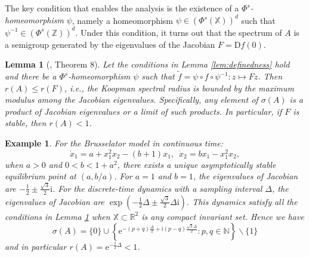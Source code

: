 \documentclass[english]{cccconf}
\renewcommand{\emph}[1]{\textit{#1}}
\newtheorem{lemma}{Lemma}
\newtheorem{example}{Example}
\newcommand{\mr}[1]{\mathrm{#1}}
\newcommand{\mbb}[1]{\mathds{#1}} %
\newcommand{\mR}{\mbb{R}}
\newcommand{\mN}{\mbb{N}}
\newcommand{\mX}{\mbb{X}}
\newcommand{\bra}[1]{\left( #1 \right)}
\newcommand{\BRA}[1]{\left\{ #1 \right\}}
\begin{document}
\par The key condition that enables the analysis is the existence of a \emph{$\Phi^s$-homeomorphism} $\psi$, namely a homeomorphism $\psi\in (\Phi^s(\mbb{X}))^d$ such that $\psi^{-1}\in (\Phi^s(\mbb{Z}))^d$. %
Under this condition, it turns out that the spectrum of $A$ is a semigroup generated by the eigenvalues of the Jacobian $F = \mr{D}f(0)$. 
\begin{lemma}[\cite{tang-ye-2025-l4dc}, Theorem 8]
\label{lem:homeomorphism}
    Let the conditions in Lemma \ref{lem:definedness} hold and there be a $\Phi^s$-homeomorphism $\psi$ such that $\tilde{f} = \psi\circ f\circ \psi^{-1}: z\mapsto Fz$. 
    Then $\textstyle r(A) \leq r(F)$, i.e., the Koopman spectral radius is bounded by the maximum modulus among the Jacobian eigenvalues. Specifically, any element of $\sigma(A)$ is a product of Jacobian eigenvalues or a limit of such products. 
    In particular, if $F$ is stable, then $r(A)<1$. 
\end{lemma}
\begin{example}\label{example1}
    For the Brusselator model in continuous time: $$\dot{x}_1 = a+x_1^2x_2 - (b+1)x_1, \enspace \dot{x}_2 = bx_1 - x_1^2x_2,$$
    when $a>0$ and $0<b<1+a^2$, there exists a unique asymptotically stable equilibrium point at $(a, b/a)$. For $a=1$ and $b=1$, the eigenvalues of Jacobian are $-\frac{1}{2}\pm \frac{\sqrt{3}}{2}\mr{i}$. 
    For the discrete-time dynamics with a sampling interval $\Delta$, the eigenvalues of Jacobian are $\exp\bra{-\frac{1}{2}\Delta \pm \frac{\sqrt{3}}{2}\Delta\mr{i}}$. This dynamics satisfy all the conditions in Lemma \ref{lem:homeomorphism} when $\mX\subset \mR^2$ is any compact invariant set. Hence we have 
    \begin{equation}\label{eq:exact.spectrum}
        \textstyle 
        \sigma(A) = \{0\}\cup \BRA{ \mr{e}^{-(p+q)\frac{\Delta}{2} + \mr{i}(p-q)\frac{\sqrt{3}\Delta}{2}} : p,q\in \mN } \backslash \{1\}
    \end{equation}
    and in particular $r(A) = \mr{e}^{-\frac{1}{2}\Delta}<1$. 
\end{example}
\end{document}
